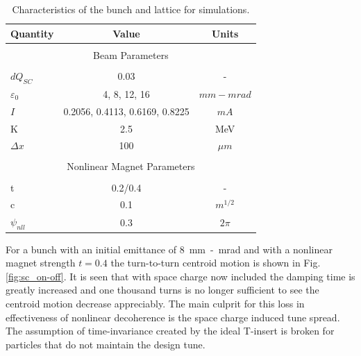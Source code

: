 \documentclass[aps,prstab,twocolumn, groupedaddress]{revtex4-1}
\begin{document}
\begin{table}
	\caption{\label{table:sc_params} Characteristics of the bunch and lattice for 
	simulations.}
	\begin{ruledtabular}
	\begin{tabular}{l|cc}
		\hline
		Quantity & Value & Units \\
		\hline
		\multicolumn{3}{c}{} \\[-1em]
		\multicolumn{3}{c}{Beam Parameters} \\
		\hline
		\\[-1em]
		$dQ_{SC}$ & 0.03 & - \\
		$\varepsilon_0$ & 4, 8, 12, 16& $mm-mrad$ \\
		$I$ &0.2056, 0.4113, 0.6169,  0.8225 & $mA$ \\
		K    &  2.5  & MeV \\
		$\Delta x$& 100 & $\mu m$ \\
		\hline
		\multicolumn{3}{c}{} \\[-1em]
		\multicolumn{3}{c}{Nonlinear Magnet Parameters} \\
		\hline
		\\[-1em]
		t & 0.2/0.4 & - \\
		c & 0.1 & $m^{1/2}$ \\
		$\psi_{nll}$& 0.3 & $2\pi$ \\
		\hline
	\end{tabular}
	\end{ruledtabular}
\end{table}	

For a bunch with an initial emittance of \SI{8}{mm-mrad} and with a nonlinear magnet 
strength $t=0.4$ the turn-to-turn centroid motion is shown in Fig. \ref{fig:sc_on-off}. It is 
seen that with space charge now included the damping time is greatly increased and one 
thousand turns is no longer sufficient to see the centroid motion decrease appreciably. 
The main culprit for this loss in effectiveness of nonlinear decoherence is the space 
charge induced tune spread. The assumption of time-invariance created by the ideal 
T-insert is broken for particles that do not maintain the design tune. 
\end{document}
